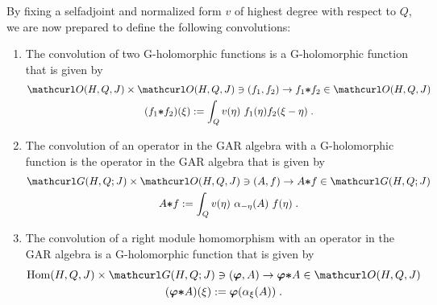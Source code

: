 \documentclass[pra,twoside,amsmath,amsfonts,amssymb,superscriptaddress,showpacs]{revtex4}
\def\9#1{{\mathcurl #1}}
\def\bS#1{{\boldsymbol #1}}
\newcommand{\GAR}[3]{\9G(#1,#3;#2)}
\newcommand{\RHOL}[3]{\9O(#1,#3,#2)}
\newcommand{\CON}{{\bS\ast}}
\newcommand{\RGHOM}[3]{{\rm Hom}(#1,#3,#2)}
\begin{document}
By fixing a selfadjoint and normalized form $v$ of highest degree with respect to $Q$, we are now
prepared to define the following convolutions:
\begin{enumerate}
\item 
The convolution of two G-holomorphic functions
is a G-holomorphic function that is given by
\begin{gather}
\RHOL{H}{J}{Q}\times\RHOL{H}{J}{Q}\ni(f_1,f_2)\to f_1\CON f_2\in\RHOL{H}{J}{Q}
\nonumber
\\
(f_1\CON f_2)(\xi):=\int_Q v(\eta) \ f_1(\eta)f_2(\xi-\eta) \; .
\end{gather}

\item 
The convolution of an operator in the GAR algebra with a G-holomorphic
function is the operator in the GAR algebra that is given by
\begin{gather}
\GAR{H}{J}{Q}\times\RHOL{H}{J}{Q}\ni(A,f)\to A\CON f\in\GAR{H}{J}{Q}
\nonumber
\\
A\CON f:=\int_Q v(\eta) \ \alpha_{-\eta}(A) \ f(\eta) \; .
\end{gather}

\item
The convolution of a right module homomorphism with an operator in the GAR algebra is a
G-holomorphic function
that is given by
\begin{gather}
\RGHOM{H}{J}{Q}\times\GAR{H}{J}{Q}\ni(\bS\varphi,A)\to\bS\varphi\CON A\in\RHOL{H}{J}{Q}
\nonumber
\\
(\bS\varphi\CON A)(\xi):=\bS\varphi(\alpha_\xi(A)) \; .
\end{gather}
\end{enumerate}
\end{document}
